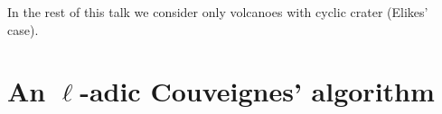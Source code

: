 \documentclass[10pt,a4paper]{beamer}
\theoremstyle{plain}
\theoremstyle{definition}
\theoremstyle{definition}
\theoremstyle{definition}
\theoremstyle{definition}
\theoremstyle{remark}
\theoremstyle{remark}
\begin{document}
\begin{frame}
\begin{figure}[h]
\begin{center}
		\end{center} 
		\end{figure}
In the rest of this talk we consider only volcanoes with cyclic crater (Elikes' case).
\end{frame}


\section{An $\ell$-adic Couveignes' algorithm}
\end{document}
